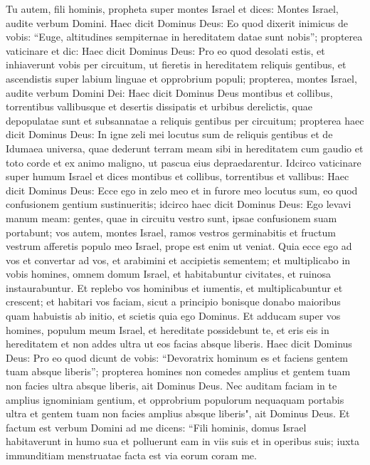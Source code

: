 \begin{biblechapter}  
\verse Tu autem, fili hominis, propheta super montes Israel et dices: Montes Israel, audite verbum Domini.  
\verse Haec dicit Dominus Deus: Eo quod dixerit inimicus de vobis: “Euge, altitudines sempiternae in hereditatem datae sunt nobis”;  
\verse propterea vaticinare et dic: Haec dicit Dominus Deus: Pro eo quod desolati estis, et inhiaverunt vobis per circuitum, ut fieretis in hereditatem reliquis gentibus, et ascendistis super labium linguae et opprobrium populi;  
\verse propterea, montes Israel, audite verbum Domini Dei: Haec dicit Dominus Deus montibus et collibus, torrentibus vallibusque et desertis dissipatis et urbibus derelictis, quae depopulatae sunt et subsannatae a reliquis gentibus per circuitum; 
\verse propterea haec dicit Dominus Deus: In igne zeli mei locutus sum de reliquis gentibus et de Idumaea universa, quae dederunt terram meam sibi in hereditatem cum gaudio et toto corde et ex animo maligno, ut pascua eius depraedarentur. 
\verse Idcirco vaticinare super humum Israel et dices montibus et collibus, torrentibus et vallibus: Haec dicit Dominus Deus: Ecce ego in zelo meo et in furore meo locutus sum, eo quod confusionem gentium sustinueritis; 
\verse idcirco haec dicit Dominus Deus: Ego levavi manum meam: gentes, quae in circuitu vestro sunt, ipsae confusionem suam portabunt; 
\verse vos autem, montes Israel, ramos vestros germinabitis et fructum vestrum afferetis populo meo Israel, prope est enim ut veniat. 
\verse Quia ecce ego ad vos et convertar ad vos, et arabimini et accipietis sementem; 
\verse et multiplicabo in vobis homines, omnem domum Israel, et habitabuntur civitates, et ruinosa instaurabuntur. 
\verse Et replebo vos hominibus et iumentis, et multiplicabuntur et crescent; et habitari vos faciam, sicut a principio bonisque donabo maioribus quam habuistis ab initio, et scietis quia ego Dominus. 
\verse Et adducam super vos homines, populum meum Israel, et hereditate possidebunt te, et eris eis in hereditatem et non addes ultra ut eos facias absque liberis. 
\verse Haec dicit Dominus Deus: Pro eo quod dicunt de vobis: “Devoratrix hominum es et faciens gentem tuam absque liberis”; 
\verse propterea homines non comedes amplius et gentem tuam non facies ultra absque liberis, ait Dominus Deus. 
\verse Nec auditam faciam in te amplius ignominiam gentium, et opprobrium populorum nequaquam portabis ultra et gentem tuam non facies amplius absque liberis", ait Dominus Deus. 
\verse Et factum est verbum Domini ad me dicens: 
\verse “Fili hominis, domus Israel habitaverunt in humo sua et polluerunt eam in viis suis et in operibus suis; iuxta immunditiam menstruatae facta est via eorum coram me.  

\end{biblechapter}
